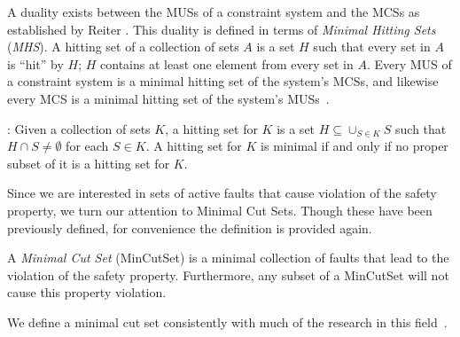 A duality exists between the MUSs of a constraint system and the MCSs as established by Reiter \cite{reiter1987theory}. This duality is defined in terms of \textit{Minimal Hitting Sets} (\textit{MHS}). A hitting set of a collection of sets $A$ is a set $H$ such that every set in $A$ is ``hit'' by $H$; $H$ contains at least one element from every set in $A$. Every MUS of a constraint system is a minimal hitting set of the system's MCSs, and likewise every MCS is a minimal hitting set of the system's MUSs~\cite{liffiton2016fast, reiter1987theory, de1987diagnosing}.
\begin{definition}: Given a collection of sets $K$, a hitting set for $K$ is a set $H \subseteq \cup_{S \in K} S$ such that $H \cap S \neq \emptyset$ for each $S  \in K$. A hitting set for $K$ is minimal if and only if no proper subset of it is a hitting set for $K$. 
\end{definition}
\noindent
Since we are interested in sets of active faults that cause violation of the safety property, we turn our attention to Minimal Cut Sets. Though these have been previously defined, for convenience the definition is provided again. 
\begin{definition}
A \textit{Minimal Cut Set} (MinCutSet) is a minimal collection of faults that lead to the violation of the safety property. Furthermore, any subset of a MinCutSet will not cause this property violation. 
\end{definition}
\noindent
We define a minimal cut set consistently with much of the research in this field~\cite{0f356f05e72f43018211b36f97c8854a,historyFTA}.





